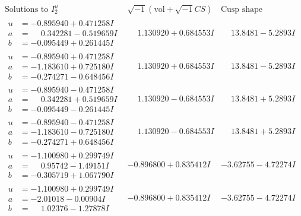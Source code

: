 \documentclass[1p]{elsarticle_modified}
\theoremstyle{definition}
\newcommand{\I}{\sqrt{-1}}
\begin{document}
$$\begin{array}{c|c|c}  
\text{Solutions to }I^u_{2}& \I (\text{vol} + \sqrt{-1}CS) & \text{Cusp shape}\\
 \hline 
\begin{aligned}
u &= -0.895940 + 0.471258 I \\
a &= \phantom{-}0.342281 - 0.519659 I \\
b &= -0.095449 + 0.261445 I\end{aligned}
 & \phantom{-}1.130920 + 0.684553 I & \phantom{-}13.8481 - 5.2893 I \\ \hline\begin{aligned}
u &= -0.895940 + 0.471258 I \\
a &= -1.183610 + 0.725180 I \\
b &= -0.274271 - 0.648456 I\end{aligned}
 & \phantom{-}1.130920 + 0.684553 I & \phantom{-}13.8481 - 5.2893 I \\ \hline\begin{aligned}
u &= -0.895940 - 0.471258 I \\
a &= \phantom{-}0.342281 + 0.519659 I \\
b &= -0.095449 - 0.261445 I\end{aligned}
 & \phantom{-}1.130920 - 0.684553 I & \phantom{-}13.8481 + 5.2893 I \\ \hline\begin{aligned}
u &= -0.895940 - 0.471258 I \\
a &= -1.183610 - 0.725180 I \\
b &= -0.274271 + 0.648456 I\end{aligned}
 & \phantom{-}1.130920 - 0.684553 I & \phantom{-}13.8481 + 5.2893 I \\ \hline\begin{aligned}
u &= -1.100980 + 0.299749 I \\
a &= \phantom{-}0.95742 - 1.49151 I \\
b &= -0.305719 + 1.067790 I\end{aligned}
 & -0.896800 + 0.835412 I & -3.62755 - 4.72274 I \\ \hline\begin{aligned}
u &= -1.100980 + 0.299749 I \\
a &= -2.01018 - 0.00904 I \\
b &= \phantom{-}1.02376 - 1.27878 I\end{aligned}
 & -0.896800 + 0.835412 I & -3.62755 - 4.72274 I \\ \hline\begin{aligned}

\end{aligned}
\end{array}$$
\end{document}
